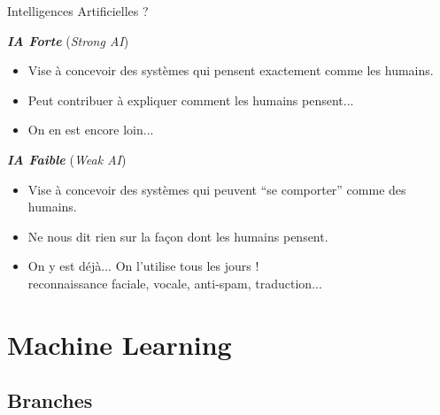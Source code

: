 \documentclass[10pt,serif,mathserif,compress,hyperref={colorlinks}]{beamer}
\begin{document}
\begin{frame}{Intelligences Artificielles ?}
  
  \textbf{\em IA Forte} ({\em Strong AI})
  \begin{itemize}
  \item Vise à concevoir des systèmes qui pensent exactement comme les humains.
  \item Peut contribuer à expliquer comment les humains pensent...
  \item On en est encore loin... 
  \end{itemize}
  
  \medskip
  
  \textbf{\em IA Faible} ({\em Weak AI})
  \begin{itemize}
  \item Vise à concevoir des systèmes qui peuvent ``se comporter'' comme des humains.
  \item Ne nous dit rien sur la façon dont les humains pensent.
  \item On y est déjà... On l'utilise tous les jours ! \\
    reconnaissance faciale, vocale, anti-spam, traduction...
  \end{itemize}
  
\end{frame}

\section{Machine Learning}


\subsection{Branches}
\end{document}
